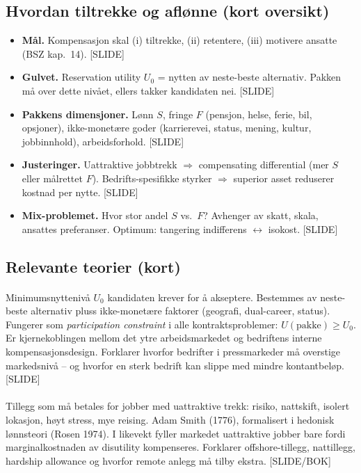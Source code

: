\subsection*{Hvordan tiltrekke og aflønne (kort oversikt)}
\begin{itemize}\setlength{\itemsep}{2pt}
\item \textbf{Mål.} Kompensasjon skal (i) tiltrekke, (ii) retentere, (iii) motivere ansatte (BSZ kap.\ 14). [SLIDE]
\item \textbf{Gulvet.} Reservation utility $U_0$ = nytten av neste-beste alternativ. Pakken må over dette nivået, ellers takker kandidaten nei. [SLIDE]
\item \textbf{Pakkens dimensjoner.} Lønn $S$, fringe $F$ (pensjon, helse, ferie, bil, opsjoner), ikke-monetære goder (karrierevei, status, mening, kultur, jobbinnhold), arbeidsforhold. [SLIDE]
\item \textbf{Justeringer.} Uattraktive jobbtrekk $\Rightarrow$ compensating differential (mer $S$ eller målrettet $F$). Bedrifts-spesifikke styrker $\Rightarrow$ superior asset reduserer kostnad per nytte. [SLIDE]
\item \textbf{Mix-problemet.} Hvor stor andel $S$ vs.\ $F$? Avhenger av skatt, skala, ansattes preferanser. Optimum: tangering indifferens $\leftrightarrow$ isokost. [SLIDE]
\end{itemize}

\subsection*{Relevante teorier (kort)}

\paragraph{\quad\SThree}
Minimumsnyttenivå $U_0$ kandidaten krever for å akseptere. Bestemmes av neste-beste alternativ pluss ikke-monetære faktorer (geografi, dual-career, status). Fungerer som \emph{participation constraint} i alle kontraktsproblemer: $U(\text{pakke}) \geq U_0$. Er kjernekoblingen mellom det ytre arbeidsmarkedet og bedriftens interne kompensasjonsdesign. Forklarer hvorfor bedrifter i pressmarkeder må overstige markedsnivå -- og hvorfor en sterk bedrift kan slippe med mindre kontantbeløp. [SLIDE]

\paragraph{\quad\SThree}
Tillegg som må betales for jobber med uattraktive trekk: risiko, nattskift, isolert lokasjon, høyt stress, mye reising. Adam Smith (1776), formalisert i hedonisk lønnsteori (Rosen 1974). I likevekt fyller markedet uattraktive jobber bare fordi marginalkostnaden av disutility kompenseres. Forklarer offshore-tillegg, nattillegg, hardship allowance og hvorfor remote anlegg må tilby ekstra. [SLIDE/BOK]

